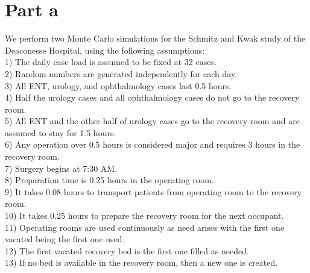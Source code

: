 \section{Part a}

We perform two Monte Carlo simulations for the Schmitz and Kwak study of the Deaconesse Hospital, using the following assumptions:\\
1) The daily case load is assumed to be fixed at 32 cases.\\
2) Random numbers are generated independently for each day.\\
3) All ENT, urology, and ophthalmology cases last 0.5 hours.\\
4) Half the urology cases and all ophthalmology cases do not go to the recovery room.\\
5) All ENT and the other half of urology cases go to the recovery room and are assumed to stay for 1.5 hours.\\
6) Any operation over 0.5 hours is considered major and requires 3 hours in the recovery room.\\
7) Surgery begins at 7:30 AM.\\
8) Preparation time is 0.25 hours in the operating room.\\
9) It takes 0.08 hours to transport patients from operating room to the recovery room.\\
10) It takes 0.25 hours to prepare the recovery room for the next occupant.\\
11) Operating rooms are used continuously as need arises with the first one vacated being the first one used.\\
12) The first vacated recovery bed is the first one filled as needed.\\
13) If no bed is available in the recovery room, then a new one is created.\\

